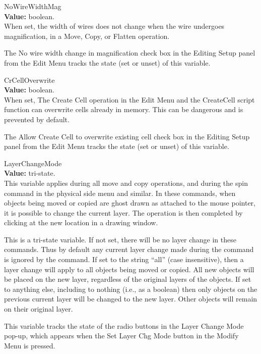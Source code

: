 \begin{description}
\item{\et NoWireWidthMag}\\
{\bf Value:} boolean.\\
When set, the width of wires does not change when the wire undergoes
magnification, in a {\cb Move}, {\cb Copy}, or {\cb Flatten}
operation.

The {\cb No wire width change in magnification} check box in the {\cb
Editing Setup} panel from the {\cb Edit Menu} tracks the state (set or
unset) of this variable.

\item{\et CrCellOverwrite}\\
{\bf Value:} boolean.\\
When set, The {\cb Create Cell} operation in the {\cb Edit Menu} and
the {\vt CreateCell} script function can overwrite cells already in
memory.  This can be dangerous and is prevented by default.

The {\cb Allow Create Cell to overwrite existing cell} check box in
the {\cb Editing Setup} panel from the {\cb Edit Menu} tracks the
state (set or unset) of this variable.

\item{\et LayerChangeMode}\\
{\bf Value:} tri-state.\\
This variable applies during all move and copy operations, and during
the {\cb spin} command in the physical side menu and similar.  In
these commands, when objects being moved or copied are ghost drawn as
attached to the mouse pointer, it is possible to change the current
layer.  The operation is then completed by clicking at the new
location in a drawing window.

This is a tri-state variable.  If not set, there will be no layer
change in these commands.  Thus by default any current layer change
made during the command is ignored by the command.  If set to the
string ``{\vt all}'' (case insensitive), then a layer change will
apply to all objects being moved or copied.  All new objects will be
placed on the new layer, regardless of the original layers of the
objects.  If set to anything else, including to nothing (i.e., as a
boolean) then only objects on the previous current layer will be
changed to the new layer.  Other objects will remain on their original
layer.

This variable tracks the state of the radio buttons in the {\cb Layer
Change Mode} pop-up, which appears when the {\cb Set Layer Chg Mode}
button in the {\cb Modify Menu} is pressed.


\end{description}
